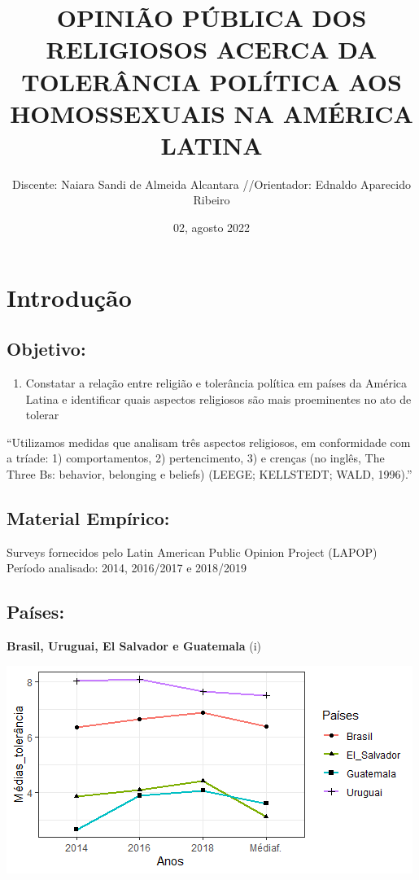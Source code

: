 \documentclass[
]{article}
\title{OPINIÃO PÚBLICA DOS RELIGIOSOS ACERCA DA TOLERÂNCIA POLÍTICA AOS
HOMOSSEXUAIS NA AMÉRICA LATINA}
\author{Discente: Naiara Sandi de Almeida Alcantara //Orientador:
Ednaldo Aparecido Ribeiro}
\date{02, agosto 2022}
\providecommand{\tightlist}{%
  \setlength{\itemsep}{0pt}\setlength{\parskip}{0pt}}
\begin{document}
\maketitle

{
\setcounter{tocdepth}{3}
\tableofcontents
}
\hypertarget{introduuxe7uxe3o}{%
\section{Introdução}\label{introduuxe7uxe3o}}

\hypertarget{objetivo}{%
\subsection{Objetivo:}\label{objetivo}}

\begin{enumerate}
\def\labelenumi{\arabic{enumi}.}
\tightlist
\item
  Constatar a relação entre religião e tolerância política em países da
  América Latina e identificar quais aspectos religiosos são mais
  proeminentes no ato de tolerar
\end{enumerate}

``Utilizamos medidas que analisam três aspectos religiosos, em
conformidade com a tríade: 1) comportamentos, 2) pertencimento, 3) e
crenças (no inglês, The Three Bs: behavior, belonging e beliefs) (LEEGE;
KELLSTEDT; WALD, 1996).'' \vspace{5truemm}

\hypertarget{material-empuxedrico}{%
\subsection{Material Empírico:}\label{material-empuxedrico}}

Surveys fornecidos pelo Latin American Public Opinion Project (LAPOP)
Período analisado: 2014, 2016/2017 e 2018/2019

\hypertarget{pauxedses}{%
\subsection{Países:}\label{pauxedses}}

\textbf{Brasil, Uruguai, El Salvador e Guatemala} (i)

\begin{center}\includegraphics[width=0.8\linewidth]{Rplot} \end{center}
\end{document}
